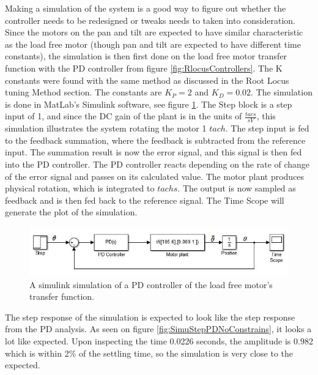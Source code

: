 Making a simulation of the system is a good way to figure out whether the controller needs to be redesigned or tweaks needs to taken into consideration. Since the motors on the pan and tilt are expected to have similar characteristic as the load free motor (though pan and tilt are expected to have different time constants), the simulation is then first done on the load free motor transfer function with the PD controller from figure \ref{fig:RlocusControllers}. The K constants were found with the same method as discussed in the Root Locus tuning Method section. The constants are $K_P = 2$ and $K_D = 0.02$.
The simulation is done in MatLab’s Simulink software, see figure \ref{fig:Simulinkmodel}. The Step block is a step input of 1, and since the DC gain of the plant is in the units of $\frac{tacs}{s V}$, this simulation illustrates the system rotating the motor 1 $tach$. The step input is fed to the feedback summation, where the feedback is subtracted from the reference input. The summation result is now the error signal, and this signal is then fed into the PD controller. The PD controller reacts depending on the rate of change of the error signal and passes on its calculated value. The motor plant produces physical rotation, which is integrated to $tachs$. The output is now sampled as feedback and is then fed back to the reference signal. The Time Scope will generate the plot of the simulation.

\begin{figure}[h!]
\centering
\includegraphics[scale=0.7]{Billeder/simulinkmodel.jpg}
\caption{ A simulink simulation of a PD controller of the load free motor’s transfer function. }
\label{fig:Simulinkmodel}
\end{figure}

The step response of the simulation is expected to look like the step response from the PD analysis. As seen on figure \ref{fig:SimuStepPDNoConstrains}, it looks a lot like expected. Upon inspecting the time 0.0226 seconds, the amplitude is 0.982 which is within 2\% of the settling time, so the simulation is very close to the expected.

